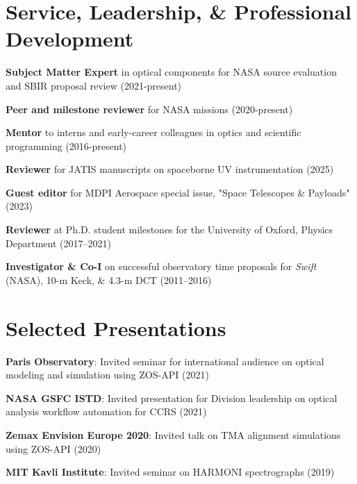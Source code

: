 \documentclass[letterpaper,11pt]{article}
\begin{document}
\section{Service, Leadership, \& Professional Development}
\begin{itemize}[leftmargin=0.15in, label={}, noitemsep, topsep=0pt]
    \small{
        \item{\textbf{Subject Matter Expert}{ in optical components for NASA source evaluation and SBIR proposal review (2021-present)}}
        \item{\textbf{Peer and milestone reviewer}{ for NASA missions (2020-present)}}
        \item{\textbf{Mentor}{ to interns and early-career colleagues in optics and scientific programming (2016-present)}}
        \item{\textbf{Reviewer}{ for JATIS manuscripts on spaceborne UV instrumentation (2025)}}
        \item{\textbf{Guest editor}{ for MDPI Aerospace special issue, "Space Telescopes \& Payloads" (2023)}}
        \item{\textbf{Reviewer}{ at Ph.D. student milestones for the University of Oxford, Physics Department (2017–2021)}}
        \item{\textbf{Investigator \& Co-I}{ on successful observatory time proposals for \textit{Swift} (NASA), 10-m Keck, \& 4.3-m DCT (2011–2016)}}
    }
\end{itemize}

\section{Selected Presentations}
\begin{itemize}[leftmargin=0.15in, label={}, noitemsep, topsep=0pt]
    \small{
        \item{\textbf{Paris Observatory}{: Invited seminar for international audience on optical modeling and simulation using ZOS-API (2021)}}
        \item{\textbf{NASA GSFC ISTD}{: Invited presentation for Division leadership on optical analysis workflow automation for CCRS (2021)}}
        \item{\textbf{Zemax Envision Europe 2020}{: Invited talk on TMA alignment simulations using ZOS-API (2020)}}
        \item{\textbf{MIT Kavli Institute}{: Invited seminar on HARMONI spectrographs (2019)}}
    }
\end{itemize}
\end{document}
